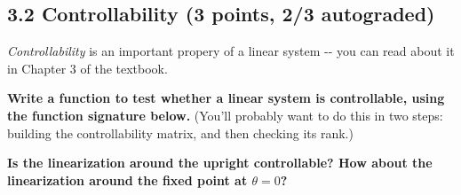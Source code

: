 \documentclass[11pt]{article}
\begin{document}
    \subsection{3.2 Controllability (3 points, 2/3
autograded)}\label{controllability-3-points-23-autograded}

\emph{Controllability} is an important propery of a linear system -\/-
you can read about it in Chapter 3 of the textbook.

\textbf{Write a function to test whether a linear system is
controllable, using the function signature below.} (You'll probably want
to do this in two steps: building the controllability matrix, and then
checking its rank.)

\textbf{Is the linearization around the upright controllable? How about
the linearization around the fixed point at \(\theta = 0\)?}
\end{document}
